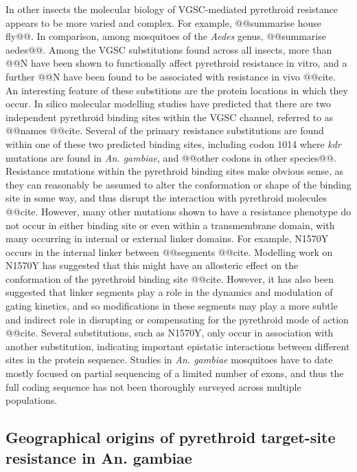 \documentclass[a4paper,11pt,abstracton,hidelinks]{scrartcl}
\begin{document}
%
In other insects the molecular biology of VGSC-mediated pyrethroid resistance appears to be more varied and complex.
%
For example, @@summarise house fly@@.
%
In comparison, among mosquitoes of the \textit{Aedes} genus, @@summarise aedes@@.
%
Among the VGSC substitutions found across all insects, more than @@N have been shown to functionally affect pyrethroid resistance in vitro, and a further @@N have been found to be associated with resistance in vivo @@cite.
%
An interesting feature of these substitions are the protein locations in which they occur.
%
In silico molecular modelling studies have predicted that there are two independent pyrethroid binding sites within the VGSC channel, referred to as @@names @@cite.
%
Several of the primary resistance substitutions are found within one of these two predicted binding sites, including codon 1014 where \textit{kdr} mutations are found in \textit{An. gambiae}, and @@other codons in other species@@.
%
Resistance mutations within the pyrethroid binding sites make obvious sense, as they can reasonably be assumed to alter the conformation or shape of the binding site in some way, and thus disrupt the interaction with pyrethroid molecules @@cite.
%
However, many other mutations shown to have a resistance phenotype do not occur in either binding site or even within a transmembrane domain, with many occurring in internal or external linker domains.
%
For example, N1570Y occurs in the internal linker between @@segments @@cite.
%
Modelling work on N1570Y has suggested that this might have an allosteric effect on the conformation of the pyrethroid binding site @@cite.
%
However, it has also been suggested that linker segments play a role in the dynamics and modulation of gating kinetics, and so modifications in these segments may play a more subtle and indirect role in disrupting or compensating for the pyrethroid mode of action @@cite.
%
Several substitutions, such as N1570Y, only occur in association with another substitution, indicating important epistatic interactions between different sites in the protein sequence.
%
Studies in \textit{An. gambiae} mosquitoes have to date mostly focused on partial sequencing of a limited number of exons, and thus the full coding sequence has not been thoroughly surveyed across multiple populations.


\subsection*{Geographical origins of pyrethroid target-site resistance in An. gambiae}
\end{document}
